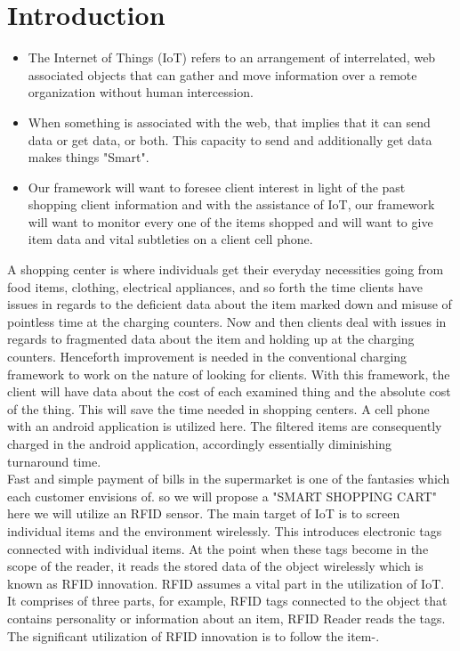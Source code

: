 \documentclass[conference]{IEEEtran}
\begin{document}
\section{Introduction}
\begin{itemize}
	\item The Internet of Things (IoT) refers to an arrangement of interrelated, web associated objects that can gather and move information over a remote organization without human intercession.
	\item When something is associated with the web, that implies that it can send data or get data, or both. This capacity to send and additionally get data makes things "Smart".
	\item Our framework will want to foresee client interest in light of the past shopping client information and with the assistance of IoT, our framework will want to monitor every one of the items shopped and will want to give item data and vital subtleties on a client cell phone.
\end{itemize}	
     A shopping center is where individuals get their everyday necessities going from food items, clothing, electrical appliances, and so forth the time clients have issues in regards to the deficient data about the item marked down and misuse of pointless time at the charging counters\cite{b5}. Now and then clients deal with issues in regards to fragmented data about the item and holding up at the charging counters. Henceforth improvement is needed in the conventional charging framework to work on the nature of looking for clients. With this framework, the client will have data about the cost of each examined thing and the absolute cost of the thing. This will save the time needed in shopping centers. A cell phone with an android application is utilized here. The filtered items are consequently charged in the android application, accordingly essentially diminishing turnaround time\cite{b6}.\\
	Fast and simple payment of bills in the supermarket is one of the fantasies which each customer envisions of. so we will propose a "SMART SHOPPING CART" here we will utilize an RFID sensor. The main target of IoT is to screen individual items and the environment wirelessly. This introduces electronic tags connected with individual items. At the point when these tags become in the scope of the reader, it reads the stored data of the object wirelessly which is known as RFID innovation\cite{b1}. RFID assumes a vital part in the utilization of IoT. It comprises of three parts, for example, RFID tags connected to the object that contains personality or information about an item, RFID Reader reads the tags. The significant utilization of RFID innovation is to follow the item\cite{b1}-\cite{b8}.
	
\end{document}
